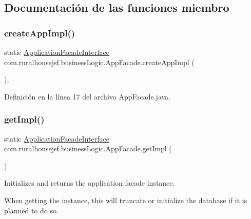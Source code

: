 \subsection{Documentación de las funciones miembro}
\mbox{\label{a00128_a8f4d396c7d2ce6ba084554d68385fc34}} 
\subsubsection{\texorpdfstring{createAppImpl()}{createAppImpl()}}
{\footnotesize\ttfamily static \mbox{\hyperlink{a00136}{Application\+Facade\+Interface}} com.\+ruralhousejsf.\+business\+Logic.\+App\+Facade.\+create\+App\+Impl (\begin{DoxyParamCaption}{ }\end{DoxyParamCaption})\hspace{0.3cm}{\ttfamily [static]}, {\ttfamily [private]}}



Definición en la línea 17 del archivo App\+Facade.\+java.

\mbox{\label{a00128_a029bcceee98b9070b9f80abc54db45d6}} 
\subsubsection{\texorpdfstring{getImpl()}{getImpl()}\hspace{0.1cm}{\footnotesize\ttfamily [1/3]}}
{\footnotesize\ttfamily static \mbox{\hyperlink{a00136}{Application\+Facade\+Interface}} com.\+ruralhousejsf.\+business\+Logic.\+App\+Facade.\+get\+Impl (\begin{DoxyParamCaption}{ }\end{DoxyParamCaption})\hspace{0.3cm}{\ttfamily [static]}}



Initializes and returns the application facade instance. 

When getting the instance, this will truncate or initialize the database if it is planned to do so.

